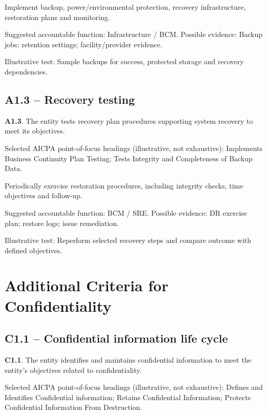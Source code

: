 \documentclass[10pt,oneside]{report}
\begin{document}
\begin{engineeringbox}
Implement backup, power/environmental protection, recovery infrastructure, restoration plans and monitoring.
\end{engineeringbox}
Suggested accountable function: Infrastructure / BCM. Possible evidence: Backup jobs; retention settings; facility/provider evidence.

Illustrative test: Sample backups for success, protected storage and recovery dependencies.

\subsection*{A1.3 -- Recovery testing}
\begin{aicpabox}
\textbf{A1.3}. The entity tests recovery plan procedures supporting system recovery to meet its objectives.\par{}
\end{aicpabox}
Selected AICPA point-of-focus headings (illustrative, not exhaustive): Implements Business Continuity Plan Testing; Tests Integrity and Completeness of Backup Data.

\begin{engineeringbox}
Periodically exercise restoration procedures, including integrity checks, time objectives and follow-up.
\end{engineeringbox}
Suggested accountable function: BCM / SRE. Possible evidence: DR exercise plan; restore logs; issue remediation.

Illustrative test: Reperform selected recovery steps and compare outcome with defined objectives.

\section{Additional Criteria for Confidentiality}
\subsection*{C1.1 -- Confidential information life cycle}
\begin{aicpabox}
\textbf{C1.1}. The entity identifies and maintains confidential information to meet the entity's objectives related to confidentiality.\par{}
\end{aicpabox}
Selected AICPA point-of-focus headings (illustrative, not exhaustive): Defines and Identifies Confidential information; Retains Confidential Information; Protects Confidential Information From Destruction.
\end{document}
